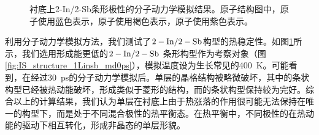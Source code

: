 \begin{figure}[htb]
    \caption{衬底上2-In/2-Sb条形极性的分子动力学模拟结果。原子结构图中，原子使用蓝色表示，原子使用褐色表示，原子使用紫色表示。}
    \label{fig:IS_structure_1Linsb_md}
\end{figure}

利用分子动力学模拟方法，我们测试了$\rm 2-In/2-Sb$构型的热稳定性。如图\ref{fig:IS_structure_1Linsb_md}所示，我们选用形成能更低的$\rm 2-In/2-Sb$ 条形构型作为考察对象（图\ref{fig:IS_structure_1Linsb_md0ps}），模拟温度设为生长常见的\SI{400}{\kelvin}。可能看到，在经过\SI{30}{\pico\second}的分子动力学模拟后。单层的晶格结构被略微破坏，其中的条状构型已经被热动能破坏，形成类似于菱形的结构，而的条状构型保持较为完好。综合以上的计算结果，我们认为单层在衬底上由于热涨落的作用很可能无法保持在唯一的构型下，而是处于不同混合极性的热平衡态。在热平衡中，不同极性的在热动能的驱动下相互转化，形成非晶态的单层形貌。

